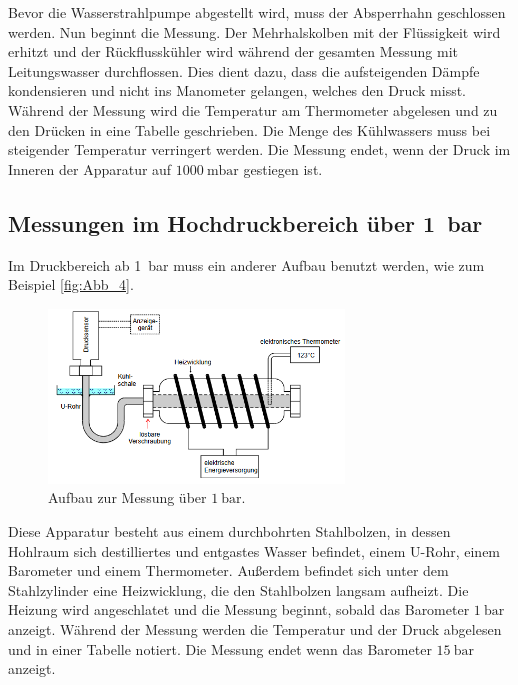 Bevor die Wasserstrahlpumpe abgestellt wird, muss der Absperrhahn geschlossen werden.
Nun beginnt die Messung.
Der Mehrhalskolben mit der Flüssigkeit wird erhitzt und der Rückflusskühler wird während der gesamten Messung mit Leitungswasser durchflossen.
Dies dient dazu, dass die aufsteigenden Dämpfe kondensieren und nicht ins Manometer gelangen, welches den Druck misst.
Während der Messung wird die Temperatur am Thermometer abgelesen und zu den Drücken in eine Tabelle geschrieben.
Die Menge des Kühlwassers muss bei steigender Temperatur verringert werden.
Die Messung endet, wenn der Druck im Inneren der Apparatur auf $\qty{1000}{\milli\bar}$ gestiegen ist.

\subsection{Messungen im Hochdruckbereich über \qty{1}{\bar}} %
\label{sub:M_Hochdruckbereich}
Im Druckbereich ab \qty{1}{\bar} muss ein anderer Aufbau benutzt werden, wie zum Beispiel \autoref{fig:Abb_4}.
\begin{figure}[H]
    \centering
    \includegraphics[width=0.7\textwidth]{build/Abb_4.PNG}
    \caption {Aufbau zur Messung über $\qty{1}{\bar}$.\cite{V203}}
    \label{fig:Abb_4}
\end{figure}
Diese Apparatur besteht aus einem durchbohrten Stahlbolzen, in dessen Hohlraum sich destilliertes und entgastes Wasser befindet,
einem U-Rohr, einem Barometer und einem Thermometer.
Außerdem befindet sich unter dem Stahlzylinder eine Heizwicklung, die den Stahlbolzen langsam aufheizt.
Die Heizung wird angeschlatet und die Messung beginnt, sobald das Barometer $\qty{1}{\bar}$ anzeigt.
Während der Messung werden die Temperatur und der Druck abgelesen und in einer Tabelle notiert.
Die Messung endet wenn das Barometer $\qty{15}{\bar}$ anzeigt.
